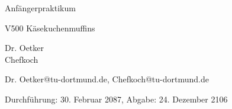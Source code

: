 \pagestyle{empty}

\begin{titlepage}



\begin{center} \large

  Anfängerpraktikum
  \vspace*{2cm}

  {\huge V500 Käsekuchenmuffins}
  \vspace*{2.5cm}

  Dr. Oetker
  \\Chefkoch
  \vspace*{1.5cm}

  Dr. Oetker@tu-dortmund.de, Chefkoch@tu-dortmund.de


  Durchführung: 30. Februar 2087, Abgabe: 24. Dezember 2106
  \vspace*{4.5cm}


\end{center}
\end{titlepage}
